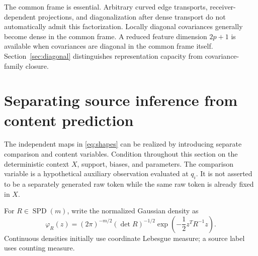 \documentclass[11pt]{article}
\newcommand{\SPD}{\operatorname{SPD}}
\begin{document}
The common frame is essential. Arbitrary curved edge transports, receiver-dependent projections, and diagonalization after dense transport do not automatically admit this factorization. Locally diagonal covariances generally become dense in the common frame. A reduced feature dimension $2p+1$ is available when covariances are diagonal in the common frame itself. Section~\ref{sec:diagonal} distinguishes representation capacity from covariance-family closure.
\section{Separating source inference from content prediction}
\label{sec:probabilistic}
The independent maps in \eqref{eq:shapes} can be realized by introducing separate comparison and content variables. Condition throughout this section on the deterministic context $X$, support, biases, and parameters. The comparison variable is a hypothetical auxiliary observation evaluated at $q_i$. It is not asserted to be a separately generated raw token while the same raw token is already fixed in $X$.

For $R\in\SPD(m)$, write the normalized Gaussian density as
\begin{equation}
\varphi_R(z)=(2\pi)^{-m/2}(\det R)^{-1/2}
\exp\left(-\frac12z^TR^{-1}z\right).
\label{eq:normal-density}
\end{equation}
Continuous densities initially use coordinate Lebesgue measure; a source label uses counting measure.
\end{document}
